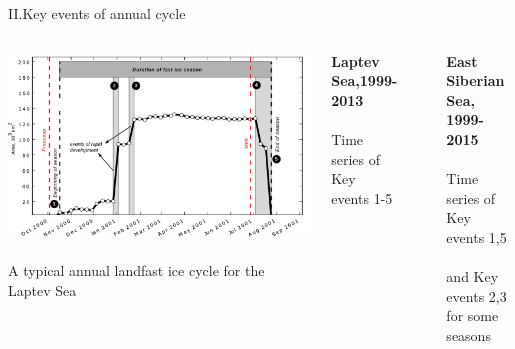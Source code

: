 \documentclass[8pt]{beamer}
\newcommand\Fontvi{\fontsize{6}{7.2}\selectfont}
\begin{document}
\setwatermark{\fontsize{125pt}{125pt}\selectfont{}}
\begin{frame}[fragile]{II.Key events of annual cycle}
	\begin{columns}
		\includegraphics[width=1.0\textwidth]{./img/Key_events_LS0.pdf}\\~\\		A typical annual landfast ice cycle for the Laptev Sea
		\Fontvi
		[Selyuzhenok et al. 2015]
			\begin{center}
				\textbf{Laptev Sea,1999-2013 }\\~\\
				Time series of Key events  1-5
			\end{center}
			\\~\\
			\begin{center}
				\textbf{East Siberian Sea, 1999-2015}\\~\\
				Time series of Key events  1,5\\~\\ and Key events 2,3 for some seasons
			\end{center}
		\end{columns}
\end{frame}
\end{document}
